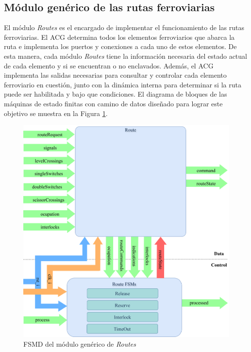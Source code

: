 \subsection{Módulo genérico de las rutas ferroviarias}
	\label{sec:ACG_rts}
	
	El módulo \textit{Routes} es el encargado de implementar el funcionamiento de las rutas ferroviarias. El ACG determina todos los elementos ferroviarios que abarca la ruta e implementa los puertos y conexiones a cada uno de estos elementos. De esta manera, cada módulo \textit{Routes} tiene la información necesaria del estado actual de cada elemento y si se encuentran o no enclavados. Además, el ACG implementa las salidas necesarias para consultar y controlar cada elemento ferroviario en cuestión, junto con la dinámica interna para determinar si la ruta puede ser habilitada y bajo que condiciones. El diagrama de bloques de las máquinas de estado finitas con camino de datos diseñado para lograr este objetivo se muestra en la Figura \ref{fig:RTS_module}.
	
	\begin{figure}[H]
		\centering
		\includegraphics[width=1\textwidth]{Figuras/RTS_module}
		\centering\caption{FSMD del módulo genérico de \textit{Routes}}
		\label{fig:RTS_module}
	\end{figure}
	
